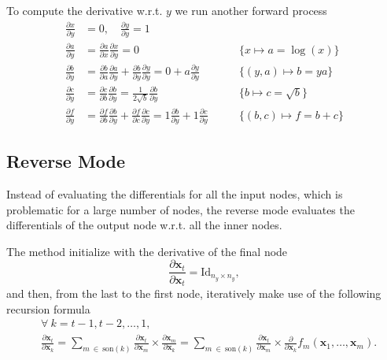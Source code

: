 To compute the derivative w.r.t. \(y\) we run another forward process
\begin{align*}
  \frac{\partial x}{\partial y} &= 0, \quad
  \frac{\partial y}{\partial y} = 1\\
  \frac{\partial a}{\partial y} &=
  \frac{\partial a}{\partial x} \frac{\partial x}{\partial y} = 0 \qquad
  &\{x \mapsto a = \log(x)\}\\
  \frac{\partial b}{\partial y} &=
  \frac{\partial b}{\partial a} \frac{\partial a}{\partial y} +
  \frac{\partial b}{\partial y} \frac{\partial y}{\partial y} =
  0 + a \frac{\partial y}{\partial y}\qquad
  &\{(y, a) \mapsto b = ya\}\\
  \frac{\partial c}{\partial y} &=
  \frac{\partial c}{\partial b} \frac{\partial b}{\partial y} =
  \frac{1}{2\sqrt{b}} \frac{\partial b}{\partial y} \qquad
  &\{b \mapsto c = \sqrt{b}\}\\
  \frac{\partial f}{\partial y} &=
  \frac{\partial f}{\partial b} \frac{\partial b}{\partial y} +
  \frac{\partial f}{\partial c} \frac{\partial c}{\partial y} =
  1 \frac{\partial b}{\partial y} + 1 \frac{\partial c}{\partial y}
  \qquad &\{(b, c) \mapsto f = b + c\}
\end{align*}

\subsection{Reverse Mode}

Instead of evaluating the differentials for all the input nodes, which
is problematic for a large number of nodes, the reverse mode evaluates
the differentials of the output node w.r.t. all the inner nodes.

The method initialize with the derivative of the final node
\[
  \frac{\partial \mathbf{x}_{t}}{\partial \mathbf{x}_{t}} =
  \text{Id}_{n_{y} \times n_{y}},
\]
and then, from the last to the first node, iteratively make use of the
following recursion formula
\begin{align*}
  &\forall~k = t - 1, t - 2, \dots, 1,\\
  &\frac{\partial\mathbf{x}_{t}}{\partial\mathbf{x}_{k}} =
    \sum_{m~\in~\text{son}(k)}
    \frac{\partial\mathbf{x}_{t}}{\partial\mathbf{x}_{m}} \times
    \frac{\partial\mathbf{x}_{m}}{\partial\mathbf{x}_{k}} =
    \sum_{m~\in~\text{son}(k)}
    \frac{\partial\mathbf{x}_{t}}{\partial\mathbf{x}_{m}} \times
    \frac{\partial}{\partial\mathbf{x}_{k}}
    f_{m}(\mathbf{x}_{1}, \dots, \mathbf{x}_{m}).
\end{align*}


